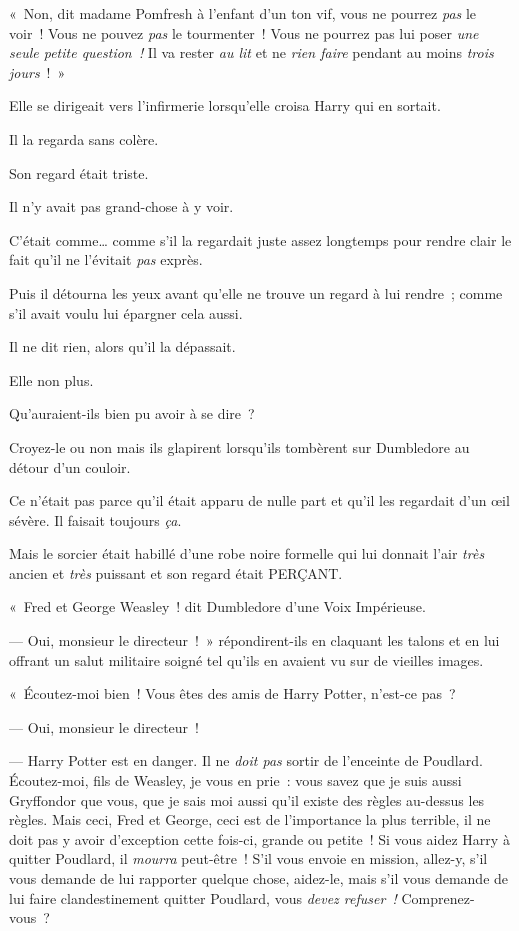
«~Non, dit madame Pomfresh à l'enfant d'un ton vif, vous ne pourrez \emph{pas} le voir~!
Vous ne pouvez \emph{pas} le tourmenter~!
Vous ne pourrez pas lui poser \emph{une seule petite question~!} Il va rester \emph{au lit} et ne \emph{rien faire} pendant au moins \emph{trois jours}~!~»


Elle se dirigeait vers l'infirmerie lorsqu'elle croisa Harry qui en sortait.

Il la regarda sans colère.

Son regard était triste.

Il n'y avait pas grand-chose à y voir.

C'était comme… comme s'il la regardait juste assez longtemps pour rendre clair le fait qu'il ne l'évitait \emph{pas} exprès.

Puis il détourna les yeux avant qu'elle ne trouve un regard à lui rendre~; comme s'il avait voulu lui épargner cela aussi.

Il ne dit rien, alors qu'il la dépassait.

Elle non plus.

Qu'auraient-ils bien pu avoir à se dire~?


Croyez-le ou non mais ils glapirent lorsqu'ils tombèrent sur Dumbledore au détour d'un couloir.

Ce n'était pas parce qu'il était apparu de nulle part et qu'il les regardait d'un œil sévère.
Il faisait toujours \emph{ça}.

Mais le sorcier était habillé d’une robe noire formelle qui lui donnait l'air \emph{très} ancien et \emph{très} puissant et son regard était PERÇANT.

«~Fred et George Weasley~! dit Dumbledore d'une Voix Impérieuse.

--- Oui, monsieur le directeur~!~»
répondirent-ils en claquant les talons et en lui offrant un salut militaire soigné tel qu'ils en avaient vu sur de vieilles images.

«~Écoutez-moi bien~!
Vous êtes des amis de Harry Potter, n'est-ce pas~?

--- Oui, monsieur le directeur~!

--- Harry Potter est en danger.
Il ne \emph{doit pas} sortir de l'enceinte de Poudlard.
Écoutez-moi, fils de Weasley, je vous en prie~: vous savez que je suis aussi Gryffondor que vous, que je sais moi aussi qu'il existe des règles au-dessus les règles.
Mais ceci, Fred et George, ceci est de l'importance la plus terrible, il ne doit pas y avoir d'exception cette fois-ci, grande ou petite~!
Si vous aidez Harry à quitter Poudlard, il \emph{mourra} peut-être~!
S'il vous envoie en mission, allez-y, s'il vous demande de lui rapporter quelque chose, aidez-le, mais s'il vous demande de lui faire clandestinement quitter Poudlard, vous \emph{devez refuser~!} Comprenez-vous~?

